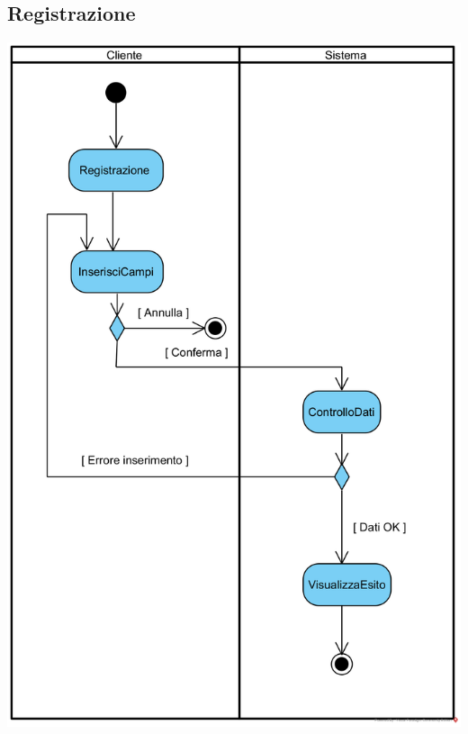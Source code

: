 \documentclass[12pt]{article}
\begin{document}
\subsection{Registrazione}
\begin{center}
\includegraphics[width=\textwidth]{ActivityDiagram/ClienteRegistrazione}
\end{center}
\end{document}
